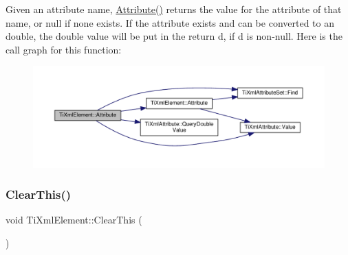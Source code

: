 Given an attribute name, \hyperlink{class_ti_xml_element_a6042f518748f475a7ac4b4e0b509eb05}{Attribute()} returns the value for the attribute of that name, or null if none exists. If the attribute exists and can be converted to an double, the double value will be put in the return \textquotesingle{}d\textquotesingle{}, if \textquotesingle{}d\textquotesingle{} is non-\/null. Here is the call graph for this function\+:\nopagebreak
\begin{figure}[H]
\begin{center}
\leavevmode
\includegraphics[width=350pt]{class_ti_xml_element_a09df893402d0ab1402c8725e6d30ec04_cgraph}
\end{center}
\end{figure}
\mbox{\label{class_ti_xml_element_a5670933ec2d7d9763b9891acc05d7f7d}} 
\subsubsection{\texorpdfstring{Clear\+This()}{ClearThis()}}
{\footnotesize\ttfamily void Ti\+Xml\+Element\+::\+Clear\+This (\begin{DoxyParamCaption}{ }\end{DoxyParamCaption})\hspace{0.3cm}{\ttfamily [protected]}}


